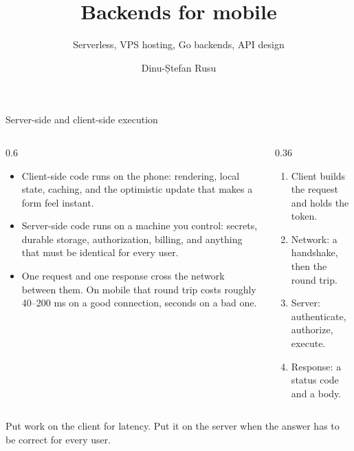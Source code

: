 \documentclass[10pt,aspectratio=169,t]{beamer}
\title{Backends for mobile}
\subtitle{Serverless, VPS hosting, Go backends, API design}
\author{Dinu-Ștefan Rusu}
\begin{document}
\titleframe



\begin{frame}[eyebrow=Server and client]{Server-side and client-side execution}
  \begin{columns}[T]
    \begin{column}{0.6\textwidth}
      \begin{itemize}
        \item Client-side code runs on the phone: rendering, local state, caching, and the optimistic update that makes a form feel instant.
        \item Server-side code runs on a machine you control: secrets, durable storage, authorization, billing, and anything that must be identical for every user.
        \item One request and one response cross the network between them. On mobile that round trip costs roughly 40–200 ms on a good connection, seconds on a bad one.
      \end{itemize}
    \end{column}
    \begin{column}{0.36\textwidth}
      \begin{enumerate}
        \item Client builds the request and holds the token.
        \item Network: a handshake, then the round trip.
        \item Server: authenticate, authorize, execute.
        \item Response: a status code and a body.
      \end{enumerate}
    \end{column}
  \end{columns}
  \begin{takeaway}{Put work on the client for latency.}
    Put it on the server when the answer has to be correct for every user.
  \end{takeaway}
\end{frame}
\end{document}
